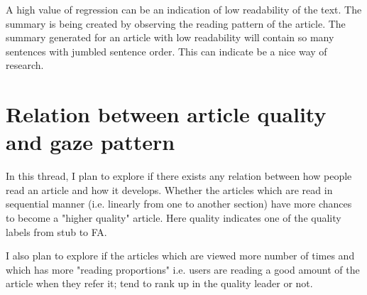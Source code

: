 \documentclass[12pt]{article}
\begin{document}
A high value of regression can be an indication of low readability of the text. The summary is being created by observing the reading pattern of the article. The summary generated for an article with low readability will contain so many sentences with jumbled sentence order. This can indicate be a nice way of research.




\section{Relation between article quality and gaze pattern}

In this thread, I plan to explore if there exists any relation between how people read an article and how it develops. Whether the articles which are read in sequential manner (i.e. linearly from one to another section) have more chances to become a "higher quality" article. Here quality indicates one of the quality labels from stub to FA.

I also plan to explore if the articles which are viewed more number of times and which has more "reading proportions" i.e. users are reading a good amount of the article when they refer it; tend to rank up in the quality leader or not.



 

\end{document}

